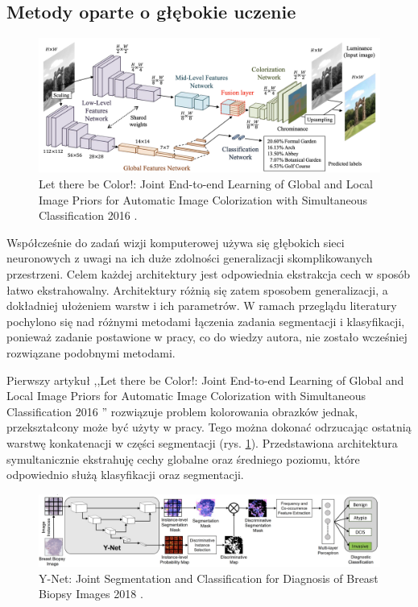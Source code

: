 \subsection{Metody oparte o głębokie uczenie}

\begin{figure}
    \includegraphics[width=\textwidth]{images/global-local-features.png}
    \caption{Let there be Color!: Joint End-to-end Learning of Global and Local Image Priors for Automatic Image Colorization with Simultaneous Classification 2016 \cite{iizuka2016let}.}
    \label{fig:parrarel-arch}
\end{figure}

Współcześnie do zadań wizji komputerowej używa się głębokich sieci neuronowych z uwagi na ich duże zdolności generalizacji skomplikowanych przestrzeni. Celem każdej architektury jest odpowiednia ekstrakcja cech w sposób łatwo ekstrahowalny. Architektury różnią się zatem sposobem generalizacji, a dokładniej ułożeniem warstw i ich parametrów. W ramach przeglądu literatury pochylono się nad różnymi metodami łączenia zadania segmentacji i klasyfikacji, ponieważ zadanie postawione w pracy, co do wiedzy autora, nie zostało wcześniej rozwiązane podobnymi metodami.

Pierwszy artykuł ,,Let there be Color!: Joint End-to-end Learning of Global and Local Image Priors for Automatic Image Colorization with Simultaneous Classification 2016 \cite{iizuka2016let}'' rozwiązuje problem kolorowania obrazków jednak, przekształcony może być użyty w pracy. Tego można dokonać odrzucając ostatnią warstwę konkatenacji w części segmentacji (rys. \ref{fig:parrarel-arch}). Przedstawiona architektura symultanicznie ekstrahuję cechy globalne oraz średniego poziomu, które odpowiednio służą klasyfikacji oraz segmentacji.

\begin{figure}
    \includegraphics[width=\textwidth]{images/y-net.png}
    \caption{Y-Net: Joint Segmentation and Classification for Diagnosis of Breast Biopsy Images 2018 \cite{mehta2018net}.}
    \label{fig:y-net}
\end{figure}

